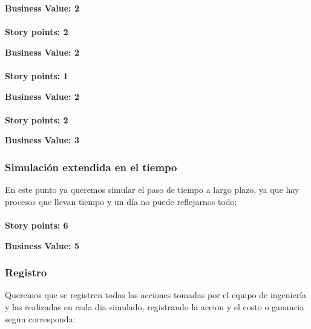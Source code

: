\documentclass[10pt,a4paper]{article}
\begin{document}
    \textbf{Business Value: 2}\\
    
    \\
    
    \textbf{Story points: 2}
    
    \textbf{Business Value: 2}\\
    
    \\
    
    \textbf{Story points: 1}
    
    \textbf{Business Value: 2}\\
    
    \\
    
    \textbf{Story points: 2}
    
    \textbf{Business Value: 3}

\subsubsection{Simulación extendida en el tiempo}
    En este punto ya queremos simular el paso de tiempo a largo plazo, ya que hay procesos que llevan tiempo y un día no puede reflejarnos todo:\\
    
    \\
    
    \textbf{Story points: 6}
    
    \textbf{Business Value: 5}

\subsubsection{Registro}
    Queremos que se registren todas las acciones tomadas por el equipo de ingeniería y las realizadas en cada dia simulado, registrando la accion y el costo o ganancia segun corresponda:\\
    
\end{document}
